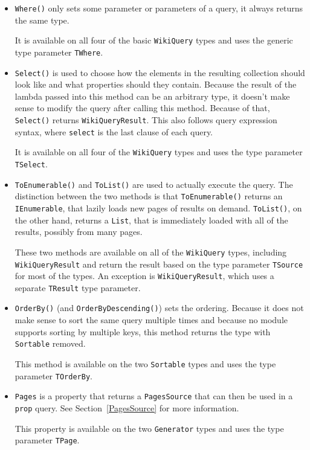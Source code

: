 \begin{itemize}
\item \lstinline{Where()} only sets some parameter or parameters of a query,
it always returns the same type.

It is available on all four of the basic \lstinline{WikiQuery} types
and uses the generic type parameter \lstinline{TWhere}.

\item \lstinline{Select()} is used to choose how the elements in the resulting collection should look like
and what properties should they contain.
Because the result of the lambda passed into this method can be an arbitrary type,
it doesn't make sense to modify the query after calling this method.
Because of that, \lstinline{Select()} returns \lstinline{WikiQueryResult}.
This also follows query expression syntax, where \lstinline{select} is the last clause of each query.

It is available on all four of the \lstinline{WikiQuery} types
and uses the type parameter \lstinline{TSelect}.

\item \lstinline{ToEnumerable()} and \lstinline{ToList()} are used to actually execute the query.
The distinction between the two methods is that \lstinline{ToEnumerable()} returns an \lstinline{IEnumerable},
that lazily loads new pages of results on demand.
\lstinline{ToList()}, on the other hand, returns a \lstinline{List},
that is immediately loaded with all of the results, possibly from many pages.

These two methods are available on all of the \lstinline{WikiQuery} types, including \lstinline{WikiQueryResult}
and return the result based on the type parameter \lstinline{TSource} for most of the types.
An exception is \lstinline{WikiQueryResult}, which uses a separate \lstinline{TResult} type parameter.

\item \lstinline{OrderBy()} (and \lstinline{OrderByDescending()}) sets the ordering.
Because it does not make sense to sort the same query multiple times
and because no module supports sorting by multiple keys,
this method returns the type with \lstinline{Sortable} removed.

This method is available on the two \lstinline{Sortable} types
and uses the type parameter \lstinline{TOrderBy}.

\item \lstinline{Pages} is a property that returns a \lstinline{PagesSource}
that can then be used in a \texttt{prop} query.
See Section~\ref{PagesSource} for more information.

This property is available on the two \lstinline{Generator} types
and uses the type parameter \lstinline{TPage}.

\end{itemize}

